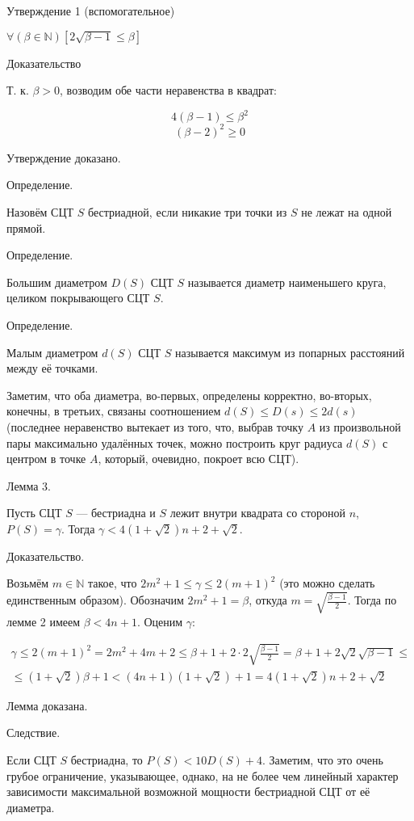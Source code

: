 \documentclass[a4paper,14pt]{article}
\begin{document}
Утверждение 1 (вспомогательное)

$\forall \left(\beta \in \mathbb N\right)\left[  2 \sqrt{\beta - 1} \leq \beta \right]$

Доказательство

Т. к. $\beta >0$, возводим обе части неравенства в квадрат:

$$4 (\beta - 1) \leq \beta^2$$
$$ (\beta-2)^2 \geq 0$$

Утверждение доказано.

Определение.

Назовём СЦТ $S$ бестриадной, если никакие три точки из $S$ не лежат на одной прямой.


Определение.

Большим диаметром $D(S)$ СЦТ $S$ называется диаметр наименьшего круга, целиком покрывающего СЦТ $S$.

Определение.

Малым диаметром $d(S)$ СЦТ $S$ называется максимум из попарных расстояний между её точками.

Заметим, что оба диаметра, во-первых, определены корректно, во-вторых, конечны, в третьих, связаны соотношением $d(S)\leq D(s) \leq 2d(s)$ (последнее неравенство вытекает из того, что, выбрав точку $A$ из произвольной пары максимально удалённых точек, можно построить круг радиуса $d(S)$ с центром в точке $A$, который, очевидно, покроет всю СЦТ).


Лемма 3.

Пусть СЦТ $S$ --- бестриадна и $S$ лежит внутри квадрата со стороной $n$, $P(S)=\gamma$.
Тогда $\gamma<4(1+\sqrt{2})n+2+\sqrt{2}$.

Доказательство.

Возьмём $m \in \mathbb{N}$ такое, что $2m^2+1 \le \gamma \le 2(m+1)^2$ (это можно сделать единственным образом).
Обозначим $2m^2+1=\beta$, откуда $m=\sqrt{\frac{\beta-1}{2}}$. Тогда по лемме 2 имеем $ \beta < 4n +1$. Оценим $\gamma$:

\begin{multline}
\gamma \le 2(m+1)^2 = 2m^2+4m +2 \leq
\beta + 1 + 2 \cdot 2 \sqrt{\frac{\beta-1}{2}} =
\beta + 1 +2\sqrt{2}\sqrt{\beta-1} \leq
\\ \leq
(1+\sqrt{2})\beta+1 <
(4n+1)(1+\sqrt{2})+1 =
4(1+\sqrt{2})n+2+\sqrt{2}
\end{multline}

Лемма доказана.

Следствие.

Если СЦТ $S$ бестриадна, то
$P(S) < 10 D(S)+4$.
Заметим, что это очень грубое ограничение, указывающее, однако, на не более чем линейный характер зависимости максимальной возможной мощности  бестриадной СЦТ от её диаметра.
\end{document}
